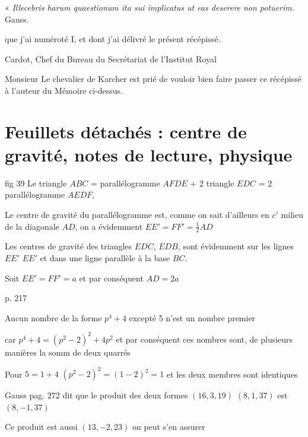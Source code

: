 \documentclass[11pt,a4paper]{article}
\begin{document}
« \emph{Illecebris harum quaestionum ita sui implicatus ut eas deserere non potuerim.} Gauss.

que j'ai numéroté I, et dont j'ai délivré le présent récépissé.

Cardot, Chef du Bureau du Secrétariat de l'Institut Royal

Monsieur Le chevalier de Karcher est prié de vouloir bien faire passer ce récépissé à l'auteur du Mémoire ci-dessus.

\section{Feuillets détachés : centre de gravité, notes de lecture, physique}


fig 39 Le triangle $ABC$ = parallélogramme $AFDE$ + 2 triangle $EDC$ = 2 parallélogramme $AEDF$,

Le centre de gravité du parallélogramme est, comme on sait d'ailleurs en $c'$ milieu de la diagonale $AD$, on a évidemment $EE' = FF' = \frac{1}{2} AD$

Les centres de gravité des triangles $EDC$, $EDB$, sont évidemment sur les lignes $EE'$ $EE'$ et dans une ligne parallèle à la base $BC$.

Soit $EE' = FF' = a$ et par conséquent $AD = 2a$


p. 217

Aucun nombre de la forme $p^4 + 4$ excepté 5 n'est un nombre premier

car $p^4 + 4 = (p^2 - 2)^2 + 4p^2$ et par conséquent ces nombres sont, de plusieurs manières la somm de deux quarrés

Pour $5 = 1 + 4$ $(p^2 - 2)^2 = (1 - 2)^2 = 1$ et les deux membres sont identiques


Gauss pag. 272 dit que le produit des deux formes $(16, 3, 19)$ $(8, 1, 37)$ est $(8, -1, 37)$

Ce produit est aussi $(13, -2, 23)$  on peut s'en assurer
\end{document}
